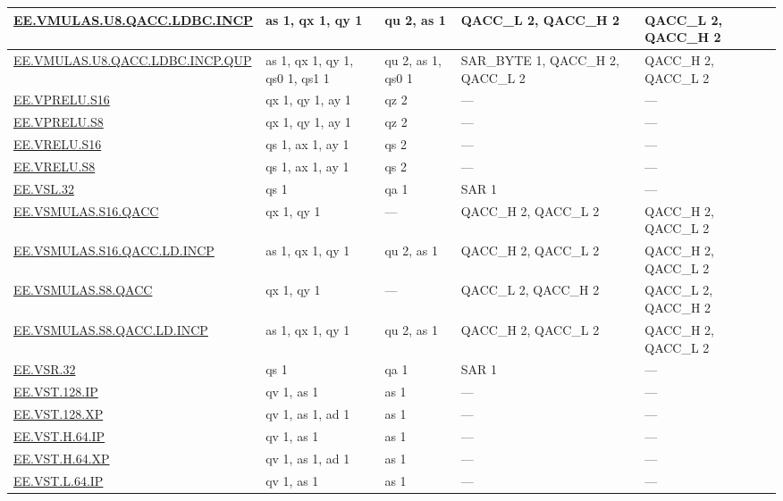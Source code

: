 \begin{longtable}[c]{|l|m{2.5cm}|m{2.5cm}|m{2.5cm}|m{2.5cm}|}
    \hyperref[instruction:EEVMULASU8QACCLDBCINCP]{EE.VMULAS.U8.QACC.LDBC.INCP} & as 1, qx 1, qy 1 & qu 2, as 1 & QACC\_L 2, QACC\_H 2 & QACC\_L 2, QACC\_H 2\\\hline
    \hyperref[instruction:EEVMULASU8QACCLDBCINCPQUP]{EE.VMULAS.U8.QACC.LDBC.INCP.QUP} & as 1, qx 1, qy 1, qs0 1, qs1 1 & qu 2, as 1, qs0 1 & SAR\_BYTE 1, QACC\_H 2, QACC\_L 2 & QACC\_H 2, QACC\_L 2\\\hline
    \hyperref[instruction:EEVPRELUS16]{EE.VPRELU.S16} & qx 1, qy 1, ay 1 & qz 2 & — & — \\\hline
    \hyperref[instruction:EEVPRELUS8]{EE.VPRELU.S8} & qx 1, qy 1, ay 1 & qz 2 & — & — \\\hline
    \hyperref[instruction:EEVRELUS16]{EE.VRELU.S16} & qs 1, ax 1, ay 1 & qs 2 & — & — \\\hline
    \hyperref[instruction:EEVRELUS8]{EE.VRELU.S8} & qs 1, ax 1, ay 1 & qs 2 & — & — \\\hline
    \hyperref[instruction:EEVSL32]{EE.VSL.32} & qs 1 & qa 1 & SAR 1 & — \\\hline
    \hyperref[instruction:EEVSMULASS16QACC]{EE.VSMULAS.S16.QACC} & qx 1, qy 1 & — & QACC\_H 2, QACC\_L 2 & QACC\_H 2, QACC\_L 2\\\hline
    \hyperref[instruction:EEVSMULASS16QACCLDINCP]{EE.VSMULAS.S16.QACC.LD.INCP} & as 1, qx 1, qy 1 & qu 2, as 1 & QACC\_H 2, QACC\_L 2 & QACC\_H 2, QACC\_L 2\\\hline
    \hyperref[instruction:EEVSMULASS8QACC]{EE.VSMULAS.S8.QACC} & qx 1, qy 1 & — & QACC\_L 2, QACC\_H 2 & QACC\_L 2, QACC\_H 2\\\hline
    \hyperref[instruction:EEVSMULASS8QACCLDINCP]{EE.VSMULAS.S8.QACC.LD.INCP} & as 1, qx 1, qy 1 & qu 2, as 1 & QACC\_H 2, QACC\_L 2 & QACC\_H 2, QACC\_L 2\\\hline
    \hyperref[instruction:EEVSR32]{EE.VSR.32} & qs 1 & qa 1 & SAR 1 & — \\\hline
    \hyperref[instruction:EEVST128IP]{EE.VST.128.IP} & qv 1, as 1 & as 1 & — & — \\\hline
    \hyperref[instruction:EEVST128XP]{EE.VST.128.XP} & qv 1, as 1, ad 1 & as 1 & — & — \\\hline
    \hyperref[instruction:EEVSTH64IP]{EE.VST.H.64.IP} & qv 1, as 1 & as 1 & — & — \\\hline
    \hyperref[instruction:EEVSTH64XP]{EE.VST.H.64.XP} & qv 1, as 1, ad 1 & as 1 & — & — \\\hline
    \hyperref[instruction:EEVSTL64IP]{EE.VST.L.64.IP} & qv 1, as 1 & as 1 & — & — \\\hline

\end{longtable}

